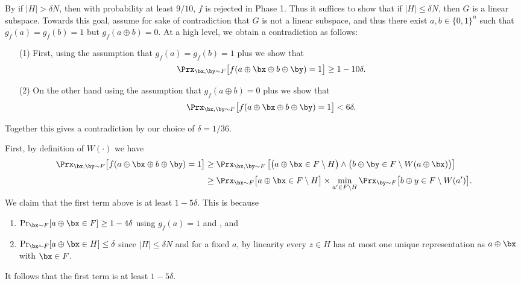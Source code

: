 \documentclass[11pt]{article}
\theoremstyle{definition}
\begin{document}
\begin{proofof}{}
By  if $|H| >\delta N$, then with probability at least $9/10$, $f$ is rejected in Phase 1. 
Thus it suffices to show that if $|H| \leq \delta N$, then $G$ is a linear subspace.
Towards this goal, assume for sake of contradiction that $G$ is not a linear subspace, and thus there exist $a,b \in \{0,1\}^n$ such that $g_f(a)=g_f(b)=1$ but $g_f(a \oplus b)=0$.
At a high level, we obtain a contradiction as follows: 
\begin{itemize}
    \item [(1)] First, using the assumption that $g_f(a)=g_f(b)=1$ plus   we show that
$$\Prx_{\bx,\by \sim F}\big[f(a \oplus \bx \oplus b \oplus \by)=1\big] \geq 1-10\delta.$$
\item[(2)] On the other hand using the assumption that $g_f(a \oplus b)=0$ plus  we show that
$$\Prx_{\bx,\by \sim F}\big[f(a \oplus \bx \oplus b \oplus \by)=1\big] < 6 \delta.$$
\end{itemize}
Together this gives a contradiction by our choice of $\delta=1/36$.

\medskip

First, by definition of $W(\cdot)$ we have
\begin{align*}
    \Prx_{\bx,\by \sim F}\big[f(a \oplus \bx \oplus b \oplus \by)=1\big]   &\geq \Prx_{\bx,\by \sim F}\left[\big( a \oplus \bx \in F \setminus H\big) \land \big(b \oplus \by \in F \setminus W(a \oplus \bx)\big)\right] \\[0.8ex]
    & \geq \Prx_{\bx \sim F}\big[ a \oplus \bx \in F \setminus H\big] \times \min_{a' \in F \setminus H} \Prx_{\by \sim F}\big[ b \oplus y \in F  \setminus W(a')\big].
\end{align*}
We claim that the first term above is at least $1-5 \delta$.
This is because 
\begin{flushleft}\begin{enumerate}
\item $\Pr_{\bx \sim F}[a \oplus \bx \in F] \geq 1-4\delta$ using $g_f(a)=1$ and , and 
\item $\Pr_{\bx \sim F}[a \oplus \bx \in H] \leq \delta$ since $|H|\le \delta N$ and for a fixed $a$, by linearity every $z \in H$ has {at most one} unique representation as $a \oplus \bx$ with $\bx\in F$. \end{enumerate}\end{flushleft}
It follows that the first term is at least $1-5\delta$.



\end{proofof}
\end{document}
